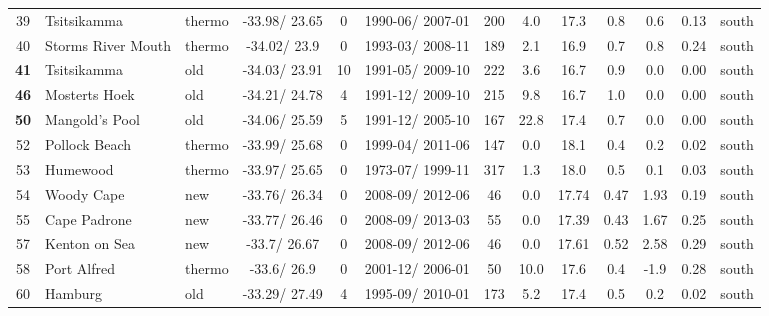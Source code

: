 \documentclass{ametsoc}
\begin{document}
\begin{table}[ht]
\begin{tabular}{cllcccccccccc}
   39 & Tsitsikamma & thermo & -33.98/ 23.65 &   0 & 1990-06/ 2007-01 & 200 & 4.0 & 17.3 & 0.8 & 0.6 & 0.13 & south \\
   40 & Storms River Mouth & thermo & -34.02/ 23.9 &   0 & 1993-03/ 2008-11 & 189 & 2.1 & 16.9 & 0.7 & 0.8 & 0.24 & south \\
   \textbf{41} & Tsitsikamma & old & -34.03/ 23.91 &  10 & 1991-05/ 2009-10 & 222 & 3.6 & 16.7 & 0.9 & 0.0 & 0.00 & south \\
   \textbf{46} & Mosterts Hoek & old & -34.21/ 24.78 &   4 & 1991-12/ 2009-10 & 215 & 9.8 & 16.7 & 1.0 & 0.0 & 0.00 & south \\
   \textbf{50} & Mangold's Pool & old & -34.06/ 25.59 &   5 & 1991-12/ 2005-10 & 167 & 22.8 & 17.4 & 0.7 & 0.0 & 0.00 & south \\
   52 & Pollock Beach & thermo & -33.99/ 25.68 &   0 & 1999-04/ 2011-06 & 147 & 0.0 & 18.1 & 0.4 & 0.2 & 0.02 & south \\
   53 & Humewood & thermo & -33.97/ 25.65 &   0 & 1973-07/ 1999-11 & 317 & 1.3 & 18.0 & 0.5 & 0.1 & 0.03 & south \\
   54 & Woody Cape & new & -33.76/ 26.34 &   0 & 2008-09/ 2012-06 &  46 & 0.0 & 17.74 & 0.47 & 1.93 & 0.19 & south \\
   55 & Cape Padrone & new & -33.77/ 26.46 &   0 & 2008-09/ 2013-03 &  55 & 0.0 & 17.39 & 0.43 & 1.67 & 0.25 & south \\
   57 & Kenton on Sea & new & -33.7/ 26.67 &   0 & 2008-09/ 2012-06 &  46 & 0.0 & 17.61 & 0.52 & 2.58 & 0.29 & south \\
   58 & Port Alfred & thermo & -33.6/ 26.9 &   0 & 2001-12/ 2006-01 &  50 & 10.0 & 17.6 & 0.4 & -1.9 & 0.28 & south \\
   60 & Hamburg & old & -33.29/ 27.49 &   4 & 1995-09/ 2010-01 & 173 & 5.2 & 17.4 & 0.5 & 0.2 & 0.02 & south \\
  \hline
  \end{tabular}
\end{table}
\end{document}
